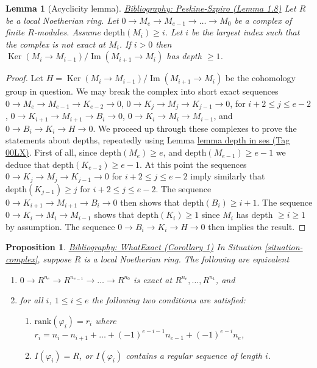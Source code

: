 \documentclass{amsart}
\newenvironment{reference}{\comment}{\endcomment}
\theoremstyle{plain}
\newtheorem{proposition}[subsection]{Proposition}
\newtheorem{lemma}[subsection]{Lemma}
\theoremstyle{definition}
\theoremstyle{remark}
\numberwithin{equation}{subsection}
\def\Ker{\mathop{\mathrm{Ker}}}
\def\Im{\mathop{\mathrm{Im}}}
\begin{document}
\begin{lemma}[Acyclicity lemma]
\label{lemma-acyclic}
\begin{reference}
\href{https://stacks.math.columbia.edu/bibliography}{Bibliography: Peskine-Szpiro (Lemma 1.8)}
\end{reference}
Let $R$ be a local Noetherian ring.
Let $0 \to M_e \to M_{e-1} \to \ldots \to M_0$
be a complex of finite $R$-modules.
Assume $\text{depth}(M_i) \geq i$.
Let $i$ be the largest index such that the complex is
not exact at $M_i$. If $i > 0$ then
$\Ker(M_i \to M_{i-1})/\Im(M_{i + 1} \to M_i)$
has depth $\geq 1$.
\end{lemma}

\begin{proof}
Let $H = \Ker(M_i \to M_{i-1})/\Im(M_{i + 1} \to M_i)$ be the
cohomology group in question.
We may break the complex into short exact sequences
$0 \to M_e \to M_{e-1} \to K_{e-2} \to 0$,
$0 \to K_j \to M_j \to K_{j-1} \to 0$, for $i + 2 \leq j \leq e-2 $,
$0 \to K_{i + 1} \to M_{i + 1} \to B_i \to 0$,
$0 \to K_i \to M_i \to M_{i-1}$, and
$0 \to B_i \to K_i \to H \to 0$.
We proceed up through these complexes to
prove the statements about depths, repeatedly using
Lemma \href{https://stacks.math.columbia.edu/tag/00LX}{lemma depth in ses (Tag 00LX)}.
First of all, since $\text{depth}(M_e) \geq e$,
and $\text{depth}(M_{e-1}) \geq e-1$ we deduce
that $\text{depth}(K_{e-2}) \geq e - 1$. At this point the
sequences $0 \to K_j \to M_j \to K_{j-1} \to 0$ for $i + 2 \leq j \leq e-2 $
imply similarly that $\text{depth}(K_{j-1}) \geq j$ for
$i + 2 \leq j \leq e-2$. The sequence
$0 \to K_{i + 1} \to M_{i + 1} \to B_i \to 0$
then shows that $\text{depth}(B_i) \geq i + 1$. The sequence
$0 \to K_i \to M_i \to M_{i-1}$ shows that $\text{depth}(K_i) \geq 1$
since $M_i$ has depth $\geq i \geq 1$ by assumption.
The sequence $0 \to B_i \to K_i \to H \to 0$ then
implies the result.
\end{proof}


\begin{proposition}
\label{proposition-what-exact}
\begin{reference}
\href{https://stacks.math.columbia.edu/bibliography}{Bibliography: WhatExact (Corollary 1)}
\end{reference}
In Situation \ref{situation-complex}, suppose $R$ is
a local Noetherian ring. The following are equivalent
\begin{enumerate}
\item $0 \to R^{n_e} \to R^{n_{e-1}} \to \ldots \to R^{n_0}$
is exact at $R^{n_e}, \ldots, R^{n_1}$, and
\item for all $i$, $1 \leq i \leq e$
the following two conditions are satisfied:
\begin{enumerate}
\item $\text{rank}(\varphi_i) = r_i$ where
$r_i = n_i - n_{i + 1} + \ldots + (-1)^{e-i-1} n_{e-1} + (-1)^{e-i} n_e$,
\item $I(\varphi_i) = R$, or $I(\varphi_i)$ contains a
regular sequence of length $i$.
\end{enumerate}
\end{enumerate}
\end{proposition}
\end{document}

